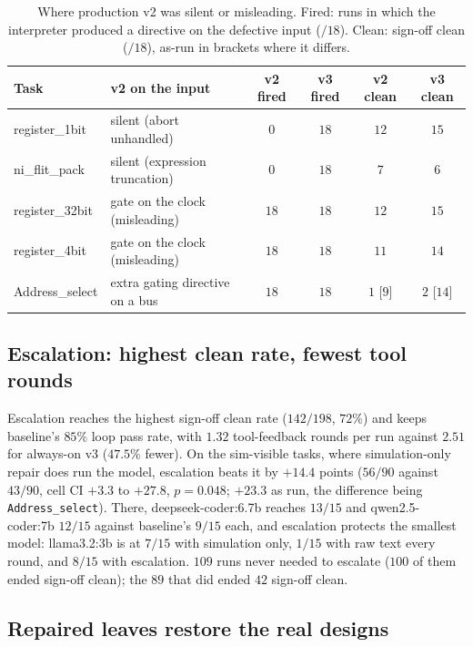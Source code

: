 \documentclass[11pt]{article}
\begin{document}
\begin{table}[htbp]
\centering
\caption{Where production v2 was silent or misleading. Fired: runs in which
the interpreter produced a directive on the defective input ($/18$).
Clean: sign-off clean ($/18$), as-run in brackets where it differs.}
\label{tab:upgrade}
\small
\begin{tabularx}{\linewidth}{@{} l X c c c c @{}}
\toprule
\textbf{Task} & \textbf{v2 on the input} & \textbf{v2 fired} & \textbf{v3 fired} & \textbf{v2 clean} & \textbf{v3 clean} \\
\midrule
register\_1bit  & silent (abort unhandled)          & $0$  & $18$ & $12$ & $15$ \\
ni\_flit\_pack  & silent (expression truncation)    & $0$  & $18$ & $7$  & $6$ \\
register\_32bit & gate on the clock (misleading)    & $18$ & $18$ & $12$ & $15$ \\
register\_4bit  & gate on the clock (misleading)    & $18$ & $18$ & $11$ & $14$ \\
Address\_select & extra gating directive on a bus   & $18$ & $18$ & $1$ [$9$] & $2$ [$14$] \\
\bottomrule
\end{tabularx}
\end{table}

\subsection{Escalation: highest clean rate, fewest tool rounds}
\label{sec:res-esc}

Escalation reaches the highest sign-off clean rate ($142/198$, $72\%$) and
keeps baseline's $85\%$ loop pass rate, with $1.32$ tool-feedback rounds per
run against $2.51$ for always-on v3 ($47.5\%$ fewer). On the sim-visible
tasks, where simulation-only repair does run the model, escalation beats it by
$+14.4$ points ($56/90$ against $43/90$, cell CI $+3.3$ to $+27.8$, $p=0.048$;
$+23.3$ as run, the difference being \texttt{Address\_select}). There,
deepseek-coder:6.7b reaches $13/15$ and qwen2.5-coder:7b $12/15$ against
baseline's $9/15$ each, and escalation protects the smallest model:
llama3.2:3b is at $7/15$ with simulation only, $1/15$ with raw text every
round, and $8/15$ with escalation. $109$ runs never needed to escalate ($100$
of them ended sign-off clean); the $89$ that did ended $42$ sign-off clean.

\subsection{Repaired leaves restore the real designs}
\label{sec:res-compose}
\end{document}
